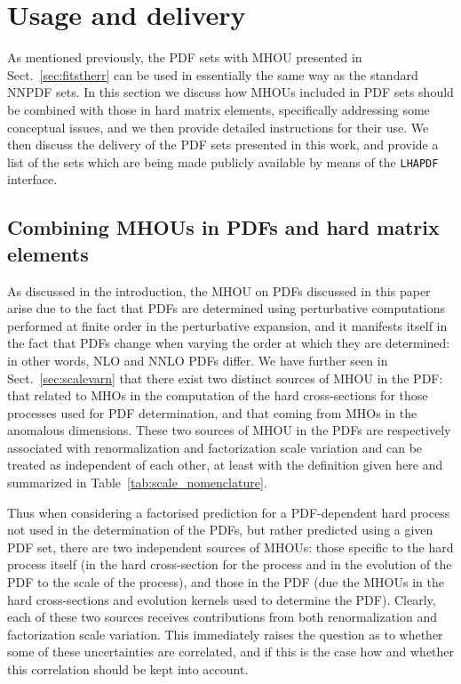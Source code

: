 \section{Usage and delivery}
\label{sec:usage}

As mentioned previously, the PDF sets with MHOU presented in
Sect.~\ref{sec:fitstherr} 
can be used in essentially the same way as the standard NNPDF
sets.
%
In this section we discuss how MHOUs included in PDF sets should
be combined with those in hard matrix elements, specifically
addressing some conceptual issues, and we then
provide detailed instructions for their use.
%
We then discuss the delivery of the
PDF sets presented in
this work, and provide a list of the sets which are being made publicly
available by means of the {\tt LHAPDF} interface.

\FloatBarrier

\subsection{Combining MHOUs in PDFs and hard matrix elements}
\label{sec:combmhou}

As discussed in the introduction, the MHOU on PDFs discussed in this
paper arise due to the fact that PDFs are determined using perturbative
computations performed at finite order in the perturbative expansion,
and it manifests itself in the fact that PDFs change when varying the order 
at which they are
determined: in other words, NLO and NNLO PDFs differ.
%
We have further seen in
Sect.~\ref{sec:scalevarn} that there exist two distinct 
sources of MHOU in the PDF: that related to MHOs in the computation of
the hard cross-sections for those processes used for PDF determination, and
that coming from MHOs in the anomalous dimensions.
%
These two sources of MHOU in the PDFs
are respectively associated with
renormalization and factorization scale variation and can be treated
as independent of each other, at least
with the definition given here and summarized in
Table~\ref{tab:scale_nomenclature}.

Thus when considering a factorised
prediction for a PDF-dependent hard process not used in the 
determination of the PDFs, 
but rather predicted using a given PDF set, there are two independent
sources of MHOUs: those specific to the hard process itself (in the hard
cross-section for the process and in the evolution of the PDF to the scale of the process), and those in the PDF (due the MHOUs in the hard cross-sections and evolution kernels used to determine the PDF).
%
Clearly, each of these two sources receives contributions from both
renormalization and factorization scale variation.
%
This immediately raises the question as to whether some of these 
uncertainties are correlated, and if this is the case
how and whether this correlation should
be kept into account.

